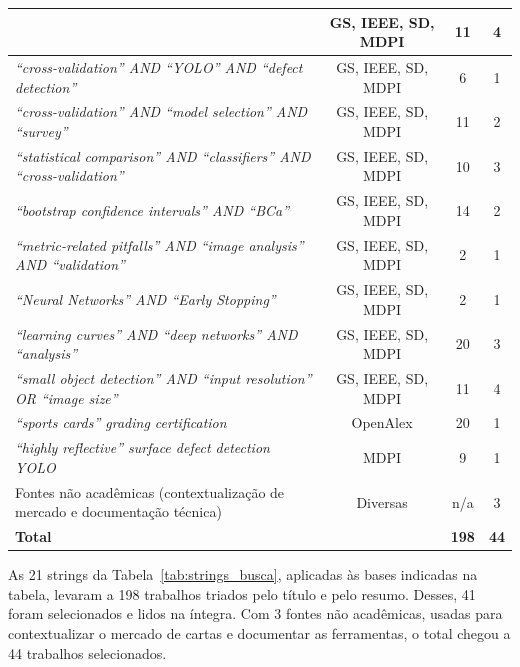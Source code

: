 \documentclass[
    12pt,                %
    openright,           %
    oneside,             %
    a4paper,             %
    english,             %
    brazil               %
]{abntex2}
\begin{document}
\begin{longtable}{p{7.5cm}|c|c|c}
    & GS, IEEE, SD, MDPI & 11 & 4 \\
\midrule
\textit{``cross-validation'' AND ``YOLO'' AND ``defect detection''}
    & GS, IEEE, SD, MDPI & 6 & 1 \\
\midrule
\textit{``cross-validation'' AND ``model selection'' AND ``survey''}
    & GS, IEEE, SD, MDPI & 11 & 2 \\
\midrule
\textit{``statistical comparison'' AND ``classifiers'' AND ``cross-validation''}
    & GS, IEEE, SD, MDPI & 10 & 3 \\
\midrule
\textit{``bootstrap confidence intervals'' AND ``BCa''}
    & GS, IEEE, SD, MDPI & 14 & 2 \\
\midrule
\textit{``metric-related pitfalls'' AND ``image analysis'' AND ``validation''}
    & GS, IEEE, SD, MDPI & 2 & 1 \\
\midrule
\textit{``Neural Networks'' AND ``Early Stopping''}
    & GS, IEEE, SD, MDPI & 2 & 1 \\
\midrule
\textit{``learning curves'' AND ``deep networks'' AND ``analysis''}
    & GS, IEEE, SD, MDPI & 20 & 3 \\
\midrule
\textit{``small object detection'' AND ``input resolution'' OR ``image size''}
    & GS, IEEE, SD, MDPI & 11 & 4 \\
\midrule
\textit{``sports cards'' grading certification}
    & OpenAlex & 20 & 1 \\
\midrule
\textit{``highly reflective'' surface defect detection YOLO}
    & MDPI & 9 & 1 \\
\midrule
Fontes não acadêmicas (contextualização de mercado e documentação técnica)
    & Diversas & n/a & 3 \\
\midrule
\textbf{Total} & & \textbf{198} & \textbf{44} \\
\end{longtable}
\endgroup

As 21 strings da
Tabela~\ref{tab:strings_busca}, aplicadas às bases indicadas na tabela, levaram a 198
trabalhos triados pelo título e pelo resumo. Desses, 41 foram
selecionados e lidos na íntegra. Com 3 fontes não acadêmicas, usadas
para contextualizar o mercado de cartas e documentar as ferramentas, o
total chegou a 44 trabalhos selecionados.
\end{document}
